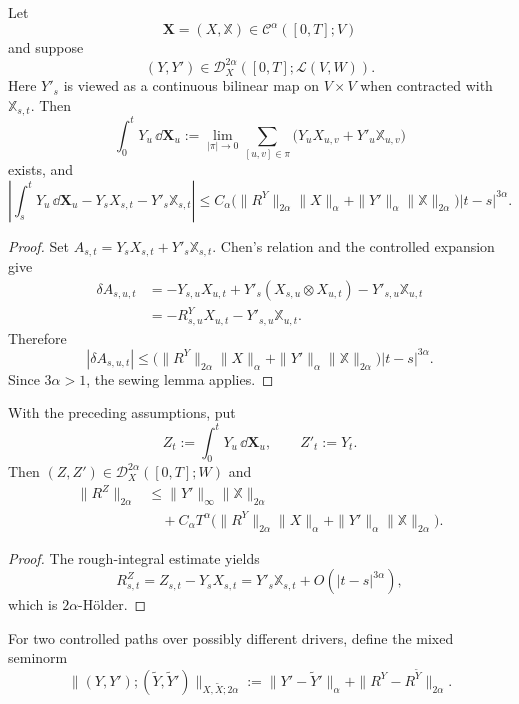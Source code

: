 \begin{prop}
Let
\[
  \mathbf X=(X,\mathbb X)\in\mathscr C^\alpha([0,T];V)
\]
and suppose
\[
  (Y,Y')\in\mathscr D_X^{2\alpha}
  ([0,T];\mathcal L(V,W)).
\]
Here $Y'_s$ is viewed as a continuous bilinear map on $V\times V$ when
contracted with $\mathbb X_{s,t}$.  Then
\[
  \int_0^tY_u\,\dd\mathbf X_u
  :=\lim_{|\pi|\to0}\sum_{[u,v]\in\pi}
    \bigl(Y_uX_{u,v}+Y'_u\mathbb X_{u,v}\bigr)
\]
exists, and
\[
 \left|\int_s^tY_u\,\dd\mathbf X_u
      -Y_sX_{s,t}-Y'_s\mathbb X_{s,t}\right|
 \le C_\alpha
 \bigl(\|R^Y\|_{2\alpha}\|X\|_\alpha
       +\|Y'\|_\alpha\|\mathbb X\|_{2\alpha}\bigr)
 |t-s|^{3\alpha}.
\]
\end{prop}

\begin{proof}
Set $A_{s,t}=Y_sX_{s,t}+Y'_s\mathbb X_{s,t}$.  Chen's relation and the
controlled expansion give
\begin{align*}
\delta A_{s,u,t}
&=-Y_{s,u}X_{u,t}+Y'_s(X_{s,u}\otimes X_{u,t})-Y'_{s,u}\mathbb X_{u,t}\\
&=-R^Y_{s,u}X_{u,t}-Y'_{s,u}\mathbb X_{u,t}.
\end{align*}
Therefore
\[
  |\delta A_{s,u,t}|
  \le\bigl(\|R^Y\|_{2\alpha}\|X\|_\alpha
       +\|Y'\|_\alpha\|\mathbb X\|_{2\alpha}\bigr)|t-s|^{3\alpha}.
\]
Since $3\alpha>1$, the sewing lemma applies.
\end{proof}

\begin{prop}
With the preceding assumptions, put
\[
  Z_t:=\int_0^tY_u\,\dd\mathbf X_u,
  \qquad Z'_t:=Y_t.
\]
Then $(Z,Z')\in\mathscr D_X^{2\alpha}([0,T];W)$ and
\begin{align*}
 \|R^Z\|_{2\alpha}
 &\le \|Y'\|_\infty\|\mathbb X\|_{2\alpha}\\
 &\quad+C_\alpha T^\alpha
 \bigl(\|R^Y\|_{2\alpha}\|X\|_\alpha
      +\|Y'\|_\alpha\|\mathbb X\|_{2\alpha}\bigr).
\end{align*}
\end{prop}

\begin{proof}
The rough-integral estimate yields
\[
  R^Z_{s,t}=Z_{s,t}-Y_sX_{s,t}
  =Y'_s\mathbb X_{s,t}+O(|t-s|^{3\alpha}),
\]
which is $2\alpha$-Hölder.
\end{proof}

For two controlled paths over possibly different drivers, define the mixed
seminorm
\[
  \|(Y,Y');(\widetilde Y,\widetilde Y')\|_{X,\widetilde X;2\alpha}
  :=\|Y'-\widetilde Y'\|_\alpha
    +\|R^Y-R^{\widetilde Y}\|_{2\alpha}.
\]

